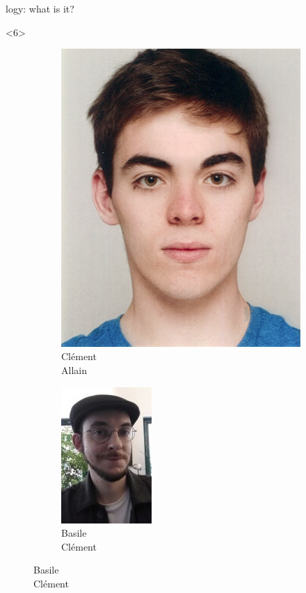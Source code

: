 \begin{frame}[fragile]{\Zoo[]logy: what is it?}
\begin{overbox}<6>
    \begin{figure}
        \begin{subfigure}{0.24\textwidth}
            \includegraphics[scale=0.55]{images/clement_allain.jpg}
            \caption*{\footnotesize Clément \\ Allain}
        \end{subfigure}
        \begin{subfigure}{0.24\textwidth}
            \includegraphics[scale=0.4]{images/basile_clement.jpg}
            \caption*{\footnotesize Basile \\ Clément}

\end{subfigure}
\end{figure}
\end{overbox}
\end{frame}
